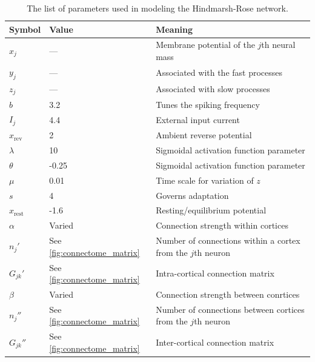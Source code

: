 \documentclass{beamer}
\newcommand{\hrx}{x}
\newcommand{\hry}{y}
\newcommand{\hrz}{z}
\newcommand{\hra}{\alpha}
\newcommand{\hrb}{\beta}
\begin{document}
\begin{frame}[t]
\begin{multicols}{3}
      \begin{table}[ht]
        \centering
        \begin{tabular}{p{1in} | p{1in} | p{5in}}
          Symbol & Value & Meaning \\ \hline
          $\hrx_{j}$ & --- & Membrane potential of the $j$th neural mass \\
          $\hry_{j}$ & --- & Associated with the fast processes \\
          $\hrz_{j}$ & --- & Associated with slow processes \\ \hline
          $b$ & 3.2 & Tunes the spiking frequency \\
          $I_{j}$ & 4.4 & External input current \\
          $\hrx_{\text{rev}}$ & 2 & Ambient reverse potential \\
          $\lambda$ & 10 & Sigmoidal activation function parameter \\
          $\theta$ & -0.25 & Sigmoidal activation function parameter \\
          $\mu$ & 0.01 & Time scale for variation of $z$ \\
          $s$ & 4 & Governs adaptation \\
          $\hrx_{\text{rest}}$ & -1.6 & Resting/equilibrium potential \\ \hline
          $\hra$ & Varied & Connection strength within cortices \\
          $n_{j}'$ & See \cref{fig:connectome_matrix} & Number of connections within a cortex from the $j$th neuron \\
          $G_{j k}'$ & See \cref{fig:connectome_matrix} & Intra-cortical connection matrix \\
          $\hrb$ & Varied & Connection strength between conrtices \\
          $n_{j}''$ & See \cref{fig:connectome_matrix} & Number of connections between cortices from the $j$th neuron \\
          $G_{j k}''$ & See \cref{fig:connectome_matrix} & Inter-cortical connection matrix
        \end{tabular}
        \caption[Hindmarsh-Rose Parameters]{The list of parameters used in modeling the Hindmarsh-Rose network.}
        \label{tab:hr_params}
      \end{table}



\end{multicols}
\end{frame}
\end{document}
